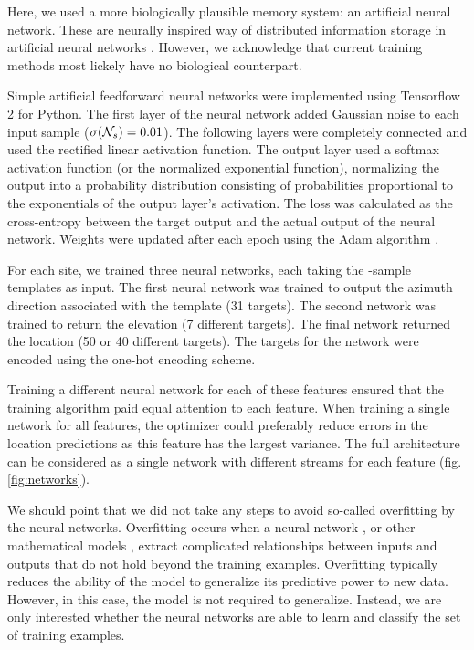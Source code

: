 \documentclass[preprint,5p]{elsarticle}
\begin{document}
Here, we used a more biologically plausible memory system: an artificial neural network. These are neurally inspired way of distributed information storage in artificial neural networks \citep{Mcleod1998}. However, we acknowledge that current training methods most lickely have no biological counterpart.

Simple artificial feedforward neural networks were implemented using Tensorflow 2 for Python. The first layer of the neural network added Gaussian noise to each input sample ($\sigma(\mathcal{N}_s) = 0.01$). The following layers were completely connected and used the rectified linear activation function. The output layer used a softmax activation function (or the normalized exponential function), normalizing the output into a probability distribution consisting of probabilities proportional to the exponentials of the output layer's activation. The loss was calculated as the cross-entropy between the target output and the actual output of the neural network. Weights were updated after each epoch using the Adam algorithm \citep{Kingma2014} .

For each site, we trained three neural networks, each taking the \pca-sample templates as input. The first neural network was trained to output the azimuth direction associated with the template (31 targets). The second network was trained to return the elevation (7 different targets). The final network returned the location (50 or 40 different targets). The targets for the network were encoded using the one-hot encoding scheme. 

Training a different neural network for each of these features ensured that the training algorithm paid equal attention to each feature. When training a single network for all features, the optimizer could preferably reduce errors in the location predictions as this feature has the largest variance. The full architecture can be considered as a single network with different streams for each feature (fig. \ref{fig:networks}).

We should point that we did not take any steps to avoid so-called overfitting by the neural networks. Overfitting occurs when a neural network \citep{Ghotra2017}, or other mathematical models \citep{Hawkins2004}, extract  complicated relationships between inputs and outputs that do not hold beyond the training examples. Overfitting typically reduces the ability of the model to generalize its predictive power to new data. However, in this case, the model is not required to generalize. Instead, we are only interested whether the neural networks are able to learn and classify the set of training examples.
\end{document}
